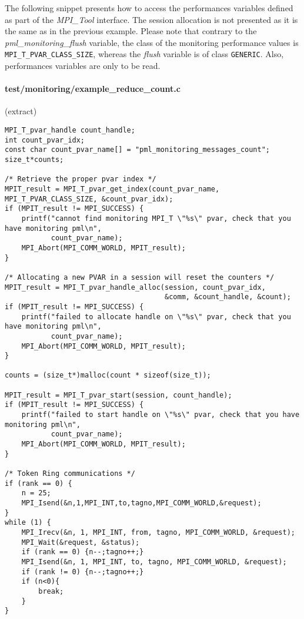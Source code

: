 \documentclass[notitlepage]{article}
\newcommand{\mpit}[1]{\textit{MPI\_Tool#1}}
\newcommand{\brkunds}[0]{\allowbreak\_}
\begin{document}
The following snippet presents how to access the performances
variables defined as part of the \mpit{} interface. The session
allocation is not presented as it is the same as in the previous
example. Please note that contrary to the {\it
  pml\brkunds{}monitoring\brkunds{}flush} variable, the class of the
monitoring performance values is {\tt
  MPI\brkunds{}T\brkunds{}PVAR\brkunds{}CLASS\brkunds{}SIZE}, whereas
the {\it flush} variable is of class {\tt GENERIC}. Also, performances
variables are only to be read.

\paragraph{test/monitoring/example\_reduce\_count.c} (extract)

\begin{verbatim}
MPI_T_pvar_handle count_handle;
int count_pvar_idx;
const char count_pvar_name[] = "pml_monitoring_messages_count";
size_t*counts;

/* Retrieve the proper pvar index */
MPIT_result = MPI_T_pvar_get_index(count_pvar_name, MPI_T_PVAR_CLASS_SIZE, &count_pvar_idx);
if (MPIT_result != MPI_SUCCESS) {
    printf("cannot find monitoring MPI_T \"%s\" pvar, check that you have monitoring pml\n",
           count_pvar_name);
    MPI_Abort(MPI_COMM_WORLD, MPIT_result);
}

/* Allocating a new PVAR in a session will reset the counters */
MPIT_result = MPI_T_pvar_handle_alloc(session, count_pvar_idx,
                                      &comm, &count_handle, &count);
if (MPIT_result != MPI_SUCCESS) {
    printf("failed to allocate handle on \"%s\" pvar, check that you have monitoring pml\n",
           count_pvar_name);
    MPI_Abort(MPI_COMM_WORLD, MPIT_result);
}

counts = (size_t*)malloc(count * sizeof(size_t));

MPIT_result = MPI_T_pvar_start(session, count_handle);
if (MPIT_result != MPI_SUCCESS) {
    printf("failed to start handle on \"%s\" pvar, check that you have monitoring pml\n",
           count_pvar_name);
    MPI_Abort(MPI_COMM_WORLD, MPIT_result);
}

/* Token Ring communications */
if (rank == 0) {
    n = 25;
    MPI_Isend(&n,1,MPI_INT,to,tagno,MPI_COMM_WORLD,&request);
}
while (1) {
    MPI_Irecv(&n, 1, MPI_INT, from, tagno, MPI_COMM_WORLD, &request);
    MPI_Wait(&request, &status);
    if (rank == 0) {n--;tagno++;}
    MPI_Isend(&n, 1, MPI_INT, to, tagno, MPI_COMM_WORLD, &request);
    if (rank != 0) {n--;tagno++;}
    if (n<0){
        break;
    }
}


\end{verbatim}
\end{document}
